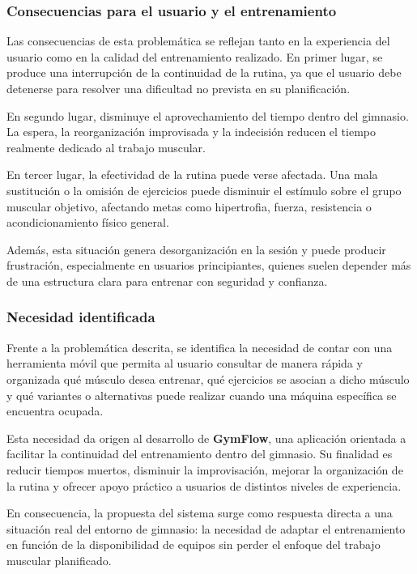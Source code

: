 \subsubsection{Consecuencias para el usuario y el entrenamiento}

Las consecuencias de esta problemática se reflejan tanto en la experiencia del usuario como en la calidad del entrenamiento realizado. En primer lugar, se produce una interrupción de la continuidad de la rutina, ya que el usuario debe detenerse para resolver una dificultad no prevista en su planificación.

En segundo lugar, disminuye el aprovechamiento del tiempo dentro del gimnasio. La espera, la reorganización improvisada y la indecisión reducen el tiempo realmente dedicado al trabajo muscular.

En tercer lugar, la efectividad de la rutina puede verse afectada. Una mala sustitución o la omisión de ejercicios puede disminuir el estímulo sobre el grupo muscular objetivo, afectando metas como hipertrofia, fuerza, resistencia o acondicionamiento físico general.

Además, esta situación genera desorganización en la sesión y puede producir frustración, especialmente en usuarios principiantes, quienes suelen depender más de una estructura clara para entrenar con seguridad y confianza.

\subsubsection{Necesidad identificada}

Frente a la problemática descrita, se identifica la necesidad de contar con una herramienta móvil que permita al usuario consultar de manera rápida y organizada qué músculo desea entrenar, qué ejercicios se asocian a dicho músculo y qué variantes o alternativas puede realizar cuando una máquina específica se encuentra ocupada.

Esta necesidad da origen al desarrollo de \textbf{GymFlow}, una aplicación orientada a facilitar la continuidad del entrenamiento dentro del gimnasio. Su finalidad es reducir tiempos muertos, disminuir la improvisación, mejorar la organización de la rutina y ofrecer apoyo práctico a usuarios de distintos niveles de experiencia.

En consecuencia, la propuesta del sistema surge como respuesta directa a una situación real del entorno de gimnasio: la necesidad de adaptar el entrenamiento en función de la disponibilidad de equipos sin perder el enfoque del trabajo muscular planificado.

